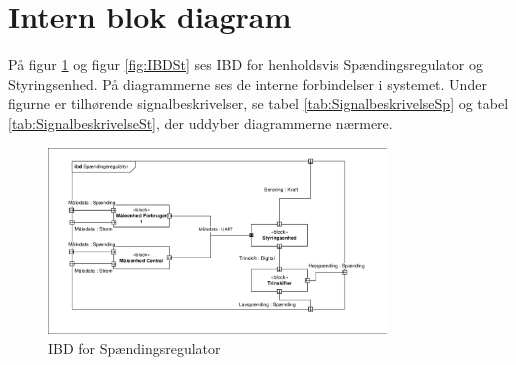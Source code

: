 
\section{Intern blok diagram}
På figur \ref{fig:IBDSp} og figur \ref{fig:IBDSt} ses IBD for henholdsvis Spændingsregulator og Styringsenhed. På diagrammerne ses de interne forbindelser i systemet. Under figurne er tilhørende signalbeskrivelser, se tabel \ref{tab:SignalbeskrivelseSp} og tabel \ref{tab:SignalbeskrivelseSt}, der uddyber diagrammerne nærmere.

\begin{figure}[htbp] %
	\centering
	\includegraphics[width=0.8\textwidth]{Figure/IBDSpaendingsregulator}
	\caption{IBD for Spændingsregulator}
	\label{fig:IBDSp}
\end{figure}

